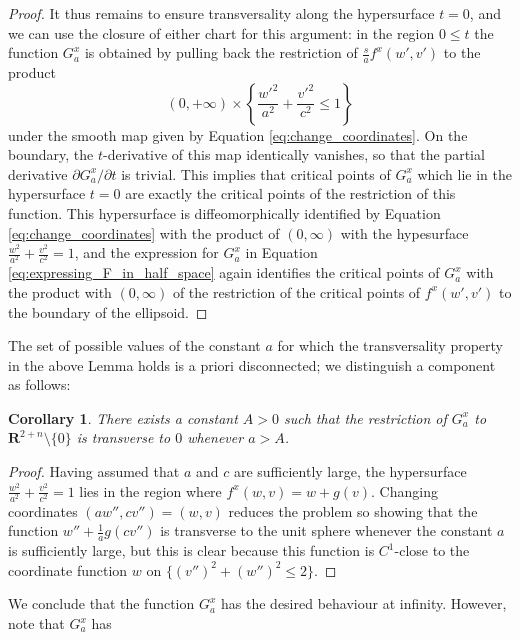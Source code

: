 \documentclass[reqno]{amsart}
\newcommand{\THOMAS}[1]%
	{\begin{quotation}{\footnotesize\textcolor{brown}{\textbf{Thomas:} #1}}\end{quotation}}
\theoremstyle{theorem}
\newtheorem{corollary}{Corollary}[section]
\theoremstyle{remark}
\theoremstyle{definition}
\newcommand{\R}{\mathbf{R}}
\begin{document}
\begin{proof}
It thus remains to ensure transversality along the hypersurface $t=0$, and we can use the closure of either chart for this argument:  in the region $0 \leq t$ the function $G^x_a$ is obtained by pulling back the restriction of $ \frac{s}{a}f^x(w',v')$ to the product
\begin{equation}
    (0,+\infty)\times \left\{\frac{w'^2}{a^2}+\frac{v'^2}{c^2} \leq  1\right\}
\end{equation}
under the smooth map given by Equation \eqref{eq:change_coordinates}. On the boundary, the $t$-derivative of this map identically vanishes, so that the partial derivative $\partial G^x_a / \partial t$ is trivial. This implies that critical points of $G^x_a$ which lie in the hypersurface $t=0$ are exactly the critical points of the restriction of this function. This hypersurface is diffeomorphically identified by Equation \eqref{eq:change_coordinates} with the product of $(0,\infty)$ with the hypesurface $ \frac{w^2}{a^2}+\frac{v^2}{c^2} = 1$, and the expression for $G^x_a$ in Equation \eqref{eq:expressing_F_in_half_space} again identifies the critical points of $G^x_a$ with the product with $(0,\infty) $ of the restriction of the critical points of $f^x(w',v')$ to the boundary of the ellipsoid.
\end{proof}
The set of possible values of the constant $a$ for which the transversality property in the above Lemma holds is a priori disconnected; we distinguish a component as follows:
\begin{corollary}\label{cor: const}
There exists a constant $A>0$ such that the restriction of $G^x_a$ to $\R^{2+n}\setminus\{0\}$ is transverse to $0$ whenever $a>A$.
\end{corollary}
\begin{proof}
  Having assumed that $a$ and $c$ are sufficiently large, the hypersurface $ \frac{w^2}{a^2}+\frac{v^2}{c^2} = 1$ lies in the region where $f^x(w,v) = w + g(v)$. Changing coordinates $(aw'',cv'')=(w,v)$ reduces the problem so showing that the function $w'' + \frac{1}{a} g(cv'')$
  is transverse to the unit sphere whenever the constant $a$ is sufficiently large, but this is clear because this function is $C^1$-close to the coordinate function $w$ on $\{(v'')^2 + (w'')^2 \leq 2\}$.
\end{proof}
We conclude that the function $G^x_a$ has the desired behaviour at infinity. However, note that $G^x_a$ has
\end{document}

